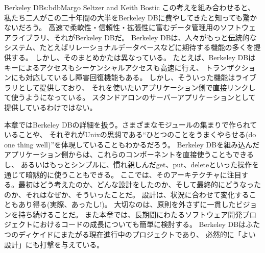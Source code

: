 \begin{aosachapter}{Berkeley DB}{s:bdb}{Margo Seltzer and Keith Bostic}
この考えを組み合わせると、私たち二人がこの二十年間の大半をBerkeley DBに費やしてきたと知っても驚かないだろう。
高速で柔軟性・信頼性・拡張性に富むデータ管理用のソフトウェアライブラリ、それがBerkeley DBだ。
Berkeley DBは、人々がもっと伝統的なシステム、たとえばリレーショナルデータベースなどに期待する機能の多くを提供する。
しかし、そのまとめかたは異なっている。
たとえば、Berkeley DBはキーによるアクセスもシーケンシャルアクセスも高速に行え、
トランザクションにも対応しているし障害回復機能もある。
しかし、そういった機能はライブラリとして提供しており、
それを使いたいアプリケーション側で直接リンクして使うようになっている。
スタンドアロンのサーバーアプリケーションとして提供しているわけではない。

本章ではBerkeley DBの詳細を扱う。さまざまなモジュールの集まりで作られていることや、
それぞれがUnixの思想である``ひとつのことをうまくやらせる(do one thing well)''を体現していることもわかるだろう。
Berkeley DBを組み込んだアプリケーション側からは、これらのコンポーネントを直接使うこともできるし、
あるいはもっとシンプルに、慣れ親しんだget、put、deleteといった操作を通じて暗黙的に使うこともできる。
ここでは、そのアーキテクチャに注目する。最初はどう考えたのか、どんな設計をしたのか、そして最終的にどうなったのか、それはなぜか、そういったことだ。
設計は、状況に合わせて変化することもあり得る(実際、あったし!)。
大切なのは、原則を外さずに一貫したビジョンを持ち続けることだ。
また本章では、長期間にわたるソフトウェア開発プロジェクトにおけるコードの成長についても簡単に検討する。
Berkeley DBはふたつのディケイドにまたがる現在進行中のプロジェクトであり、
必然的に「よい設計」にも打撃を与えている。


\end{aosachapter}
